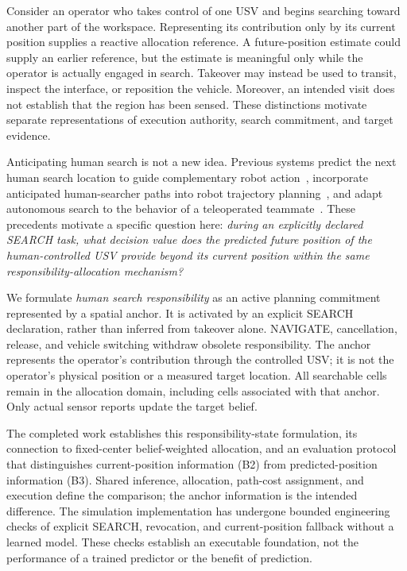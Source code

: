\documentclass[conference]{IEEEtran}
\begin{document}
Consider an operator who takes control of one USV and begins searching toward another part of the workspace. Representing its contribution only by its current position supplies a reactive allocation reference. A future-position estimate could supply an earlier reference, but the estimate is meaningful only while the operator is actually engaged in search. Takeover may instead be used to transit, inspect the interface, or reposition the vehicle. Moreover, an intended visit does not establish that the region has been sensed. These distinctions motivate separate representations of execution authority, search commitment, and target evidence.

Anticipating human search is not a new idea. Previous systems predict the next human search location to guide complementary robot action~\cite{Xie2011Intention}, incorporate anticipated human-searcher paths into robot trajectory planning~\cite{Heintzman2021Anticipatory}, and adapt autonomous search to the behavior of a teleoperated teammate~\cite{KrzysiakButail2025Movement,bb2025}. These precedents motivate a specific question here: \emph{during an explicitly declared SEARCH task, what decision value does the predicted future position of the human-controlled USV provide beyond its current position within the same responsibility-allocation mechanism?}

We formulate \emph{human search responsibility} as an active planning commitment represented by a spatial anchor. It is activated by an explicit SEARCH declaration, rather than inferred from takeover alone. NAVIGATE, cancellation, release, and vehicle switching withdraw obsolete responsibility. The anchor represents the operator's contribution through the controlled USV; it is not the operator's physical position or a measured target location. All searchable cells remain in the allocation domain, including cells associated with that anchor. Only actual sensor reports update the target belief.

The completed work establishes this responsibility-state formulation, its connection to fixed-center belief-weighted allocation, and an evaluation protocol that distinguishes current-position information (B2) from predicted-position information (B3). Shared inference, allocation, path-cost assignment, and execution define the comparison; the anchor information is the intended difference. The simulation implementation has undergone bounded engineering checks of explicit SEARCH, revocation, and current-position fallback without a learned model. These checks establish an executable foundation, not the performance of a trained predictor or the benefit of prediction.
\end{document}
